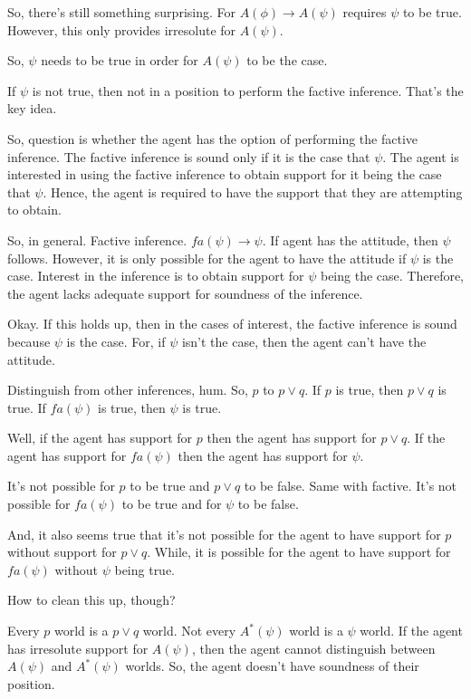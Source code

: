 \documentclass[10pt]{article}
\begin{document}
\begin{note}[Note]
  So, there's still something surprising.
  For \(A(\phi) \rightarrow A(\psi)\) requires \(\psi\) to be true.
  However, this only provides irresolute for \(A(\psi)\).

  So, \(\psi\) needs to be true in order for \(A(\psi)\) to be the case.

  If \(\psi\) is not true, then not in a position to perform the factive inference.
  That's the key idea.

  So, question is whether the agent has the option of performing the factive inference.
  The factive inference is sound only if it is the case that \(\psi\).
  The agent is interested in using the factive inference to obtain support for it being the case that \(\psi\).
  Hence, the agent is required to have the support that they are attempting to obtain.

  So, in general.
  Factive inference.
  \(fa(\psi) \rightarrow \psi\).
  If agent has the attitude, then \(\psi\) follows.
  However, it is only possible for the agent to have the attitude if \(\psi\) is the case.
  Interest in the inference is to obtain support for \(\psi\) being the case.
  Therefore, the agent lacks adequate support for soundness of the inference.

  Okay.
  If this holds up, then in the cases of interest, the factive inference is sound because \(\psi\) is the case.
  For, if \(\psi\) isn't the case, then the agent can't have the attitude.

  Distinguish from other inferences, hum.
  So, \(p\) to \(p \lor q\).
  If \(p\) is true, then \(p \lor q\) is true.
  If \(fa(\psi)\) is true, then \(\psi\) is true.

  Well, if the agent has support for \(p\) then the agent has support for \(p \lor q\).
  If the agent has support for \(fa(\psi)\) then the agent has support for \(\psi\).

  It's not possible for \(p\) to be true and \(p \lor q\) to be false.
  Same with factive.
  It's not possible for \(fa(\psi)\) to be true and for \(\psi\) to be false.

  And, it also seems true that it's not possible for the agent to have support for \(p\) without support for \(p \lor q\).
  While, it is possible for the agent to have support for \(fa(\psi)\) without \(\psi\) being true.

  How to clean this up, though?

  Every \(p\) world is a \(p \lor q\) world.
  Not every \(A^{*}(\psi)\) world is a \(\psi\) world.
  If the agent has irresolute support for \(A(\psi)\), then the agent cannot distinguish between \(A(\psi)\) and \(A^{*}(\psi)\) worlds.
  So, the agent doesn't have soundness of their position.


\end{note}
\end{document}

